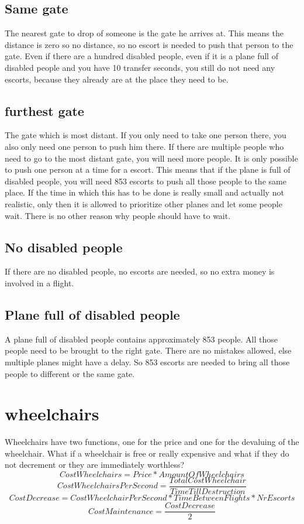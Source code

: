 \documentclass[a4paper, 11pt, notitlepage]{report}
\begin{document}
\subsection{Same gate}
The nearest gate to drop of someone is the gate he arrives at. This means the distance is zero so no distance, so no escort is needed to push that person to the gate. Even if there are a hundred disabled people, even if it is a plane full of disabled people and you have 10 transfer seconds, you still do not need any escorts, because they already are at the place they need to be.
\subsection{furthest gate}
The gate which is most distant. If you only need to take one person there, you also only need one person to push him there. If there are multiple people who need to go to the most distant gate, you will need more people. It is only possible to push one person at a time for a escort. This means that if the plane is full of disabled people, you will need 853 escorts to push all those people to the same place. If the time in which this has to be done is really small and actually not realistic, only then it is allowed to prioritize other planes and let some people wait. There is no other reason why people should have to wait.
\subsection{No disabled people}
If there are no disabled people, no escorts are needed, so no extra money is involved in a flight.
\subsection{Plane full of disabled people}
A plane full of disabled people contains approximately 853 people. All those people need to be brought to the right gate. There are no mistakes allowed, else multiple planes might have a delay. So 853 escorts are needed to bring all those people to different or the same gate.
\section{wheelchairs}
Wheelchairs have two functions, one for the price and one for the devaluing of the wheelchair. What if a wheelchair is free or really expensive and what if they do not decrement or they are immediately worthless?\\
\begin{equation}
CostWheelchairs = Price * AmountOfWheelchairs
\end{equation}
\begin{equation}
CostWheelchairsPerSecond = \frac{TotalCostWheelchair}{TimeTillDestruction}
\end{equation}
\begin{equation}
CostDecrease = CostWheelchairPerSecond * TimeBetweenFlights * NrEscorts
\end{equation}
\begin{equation}
CostMaintenance = \frac{CostDecrease}{2}
\end{equation}
\end{document}
